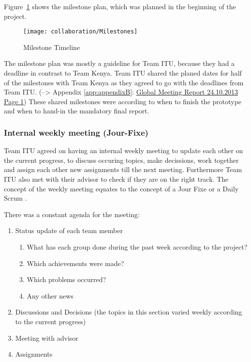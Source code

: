 Figure~\ref{fig:milestones} shows the milestone plan, which was planned in the beginning of the project.

	\begin{figure}[htb]
		\centering
		\texttt{[image: collaboration/Milestones]}
		\caption{Milestone Timeline}
		\label{fig:milestones}
	\end{figure}

The milestone plan was mostly a guideline for Team ITU, because they had a deadline in contrast to Team Kenya. Team ITU shared the planed dates for half of the milestones with Team Kenya as they agreed to go with the deadlines from Team ITU. (--> Appendix \ref{app:appendixB}: \hyperlink{GSD20131024.1}{Global Meeting Report 24.10.2013 Page 1}) These shared milestones were according to when to finish the prototype and when to hand-in the mandatory final report.

\subsubsection{Internal weekly meeting (Jour-Fixe)}
Team ITU agreed on having an internal weekly meeting to update each other on the current progress, to discuss occuring topics, make decissions, work together and assign each other new assignments till the next meeting. Furthermore Team ITU also met with their advisor to check if they are on the right track. The concept of the weekly meeting equates to the concept of a Jour Fixe  or a Daily Scrum .

There was a constant agenda for the meeting:

	\begin{enumerate}
		\item Status update of each team member
			\begin{enumerate}
				\item What has each group done during the past week according to the project?
				\item Which achievements were made?	
				\item Which problems occurred?
				\item Any other news
			\end{enumerate}
		\item Discussions and Decisions (the topics in this section varied weekly according to the current progress)
		\item Meeting with advisor	
		\item Assignments
	\end{enumerate}


